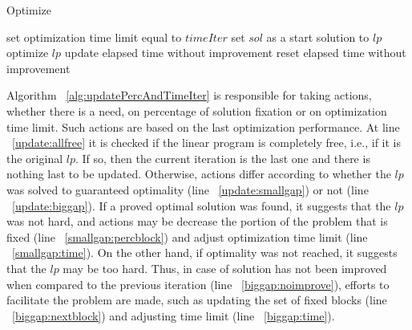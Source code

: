 \begin{algorithm}[H]
  \caption{Optimize
    \label{alg:optimize}}
  \begin{algorithmic}[1]
			\State set optimization time limit equal to $timeIter$
			\State set $sol$ as a start solution to $lp$	
			\State optimize $lp$
					\State update elapsed time without improvement
				\Else
					\State reset elapsed time without improvement
				\EndIf
			\EndIf
    \EndProcedure	
  \end{algorithmic}	
\end{algorithm}		

Algorithm ~\ref{alg:updatePercAndTimeIter} is responsible for taking actions, whether there is a need, on percentage of solution fixation or on optimization time limit. Such actions are based on the last optimization performance. At line ~\ref{update:allfree} it is checked if the linear program is completely free, i.e., if it is the original $lp$. If so, then the current iteration is the last one and there is nothing last to be updated. Otherwise, actions differ according to whether the $lp$ was solved to guaranteed optimality (line ~\ref{update:smallgap}) or not (line ~\ref{update:biggap}). If a proved optimal solution was found, it suggests that the $lp$ was not hard, and actions may be decrease the portion of the problem that is fixed (line ~\ref{smallgap:percblock}) and adjust optimization time limit (line ~\ref{smallgap:time}). On the other hand, if optimality was not reached, it suggests that the $lp$ may be too hard. Thus, in case of solution has not been improved when compared to the previous iteration (line ~\ref{biggap:noimprove}), efforts to facilitate the problem are made, such as updating the set of fixed blocks (line ~\ref{biggap:nextblock}) and adjusting time limit (line ~\ref{biggap:time}).


